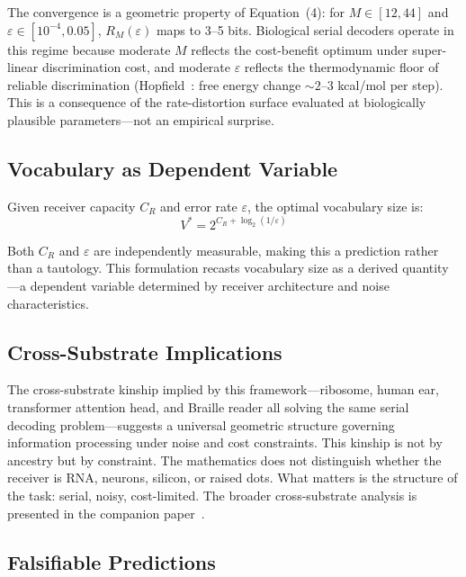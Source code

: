 \documentclass[11pt]{article}
\begin{document}
The convergence is a geometric property of Equation~(4): for $M \in [12, 44]$ and $\varepsilon \in [10^{-4}, 0.05]$, $R_M(\varepsilon)$ maps to 3--5 bits. Biological serial decoders operate in this regime because moderate $M$ reflects the cost-benefit optimum under super-linear discrimination cost, and moderate $\varepsilon$ reflects the thermodynamic floor of reliable discrimination (Hopfield~\cite{hopfield1974}: free energy change $\sim 2$--3 kcal/mol per step). This is a consequence of the rate-distortion surface evaluated at biologically plausible parameters---not an empirical surprise.

\subsection{Vocabulary as Dependent Variable}

Given receiver capacity $C_R$ and error rate $\varepsilon$, the optimal vocabulary size is:
\begin{equation}
    V^* = 2^{C_R + \log_2(1/\varepsilon)}
\end{equation}

Both $C_R$ and $\varepsilon$ are independently measurable, making this a prediction rather than a tautology. This formulation recasts vocabulary size as a derived quantity---a dependent variable determined by receiver architecture and noise characteristics.

\subsection{Cross-Substrate Implications}

The cross-substrate kinship implied by this framework---ribosome, human ear, transformer attention head, and Braille reader all solving the same serial decoding problem---suggests a universal geometric structure governing information processing under noise and cost constraints. This kinship is not by ancestry but by constraint. The mathematics does not distinguish whether the receiver is RNA, neurons, silicon, or raised dots. What matters is the structure of the task: serial, noisy, cost-limited. The broader cross-substrate analysis is presented in the companion paper~\cite{whitmer2026tb}.

\subsection{Falsifiable Predictions}
\end{document}
